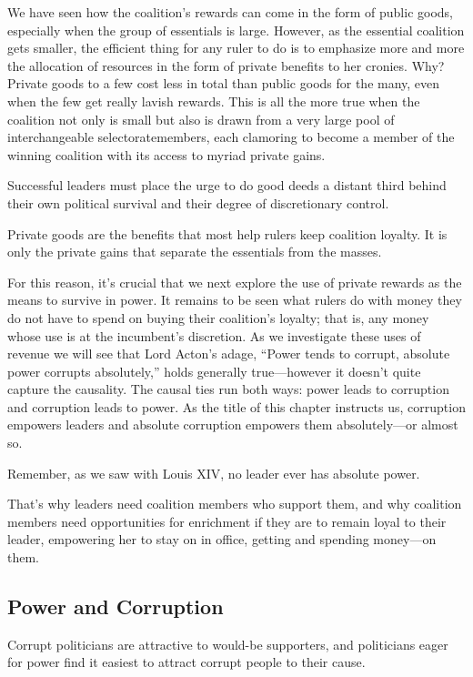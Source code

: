 \documentclass[10pt]{article}
\begin{document}
{\large We have seen how the coalition's rewards can come in the form of public
goods, especially when the group of essentials is large. However, as the
essential coalition gets smaller, the efficient thing for any ruler to do is to
emphasize more and more the allocation of resources in the form of private
benefits to her cronies. Why? Private goods to a few cost less in total than
public goods for the many, even when the few get really lavish rewards. This is
all the more true when the coalition not only is small but also is drawn from a
very large pool of interchangeable selectoratemembers, each clamoring to become a
member of the winning coalition with its access to myriad private gains.}

{\large Successful leaders must place the urge to do good deeds a distant third
behind their own political survival and their degree of discretionary control.}

{\large Private goods are the benefits that most help rulers keep coalition
loyalty. It is only the private gains that separate the essentials from the
masses.}

{\large For this reason, it's crucial that we next explore the use of private
rewards as the means to survive in power. It remains to be seen what rulers do
with money they do not have to spend on buying their coalition's loyalty; that
is, any money whose use is at the incumbent's discretion. As we investigate these
uses of revenue we will see that Lord Acton's adage, ``Power tends to corrupt,
absolute power corrupts absolutely,'' holds generally true---however it doesn't
quite capture the causality. The causal ties run both ways: power leads to
corruption and corruption leads to power. As the title of this chapter instructs
us, corruption empowers leaders and absolute corruption empowers them
absolutely---or almost so.}

{\large Remember, as we saw with Louis XIV, no leader ever has absolute power.}

{\large That's why leaders need coalition members who support them, and why
coalition members need opportunities for enrichment if they are to remain loyal
to their leader, empowering her to stay on in office, getting and spending
money---on them.}

\subsection{Power and Corruption}

{\large Corrupt politicians are attractive to would-be supporters, and
politicians eager for power find it easiest to attract corrupt people to their
cause.}
\end{document}
